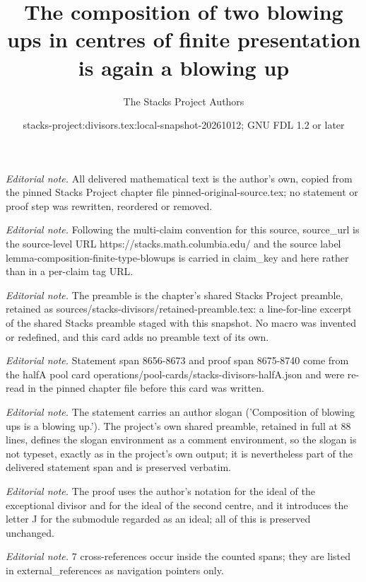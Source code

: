 \documentclass[10pt,a4paper]{amsart}
\title{The composition of two blowing ups in centres of finite presentation is again a blowing up}
\author{The Stacks Project Authors}
\date{stacks-project:divisors.tex:local-snapshot-20261012; GNU FDL 1.2 or later}
\theoremstyle{plain}
\theoremstyle{definition}
\theoremstyle{remark}
\numberwithin{equation}{subsection}
\begin{document}
\maketitle
\noindent\textit{Editorial note.} All delivered mathematical text is the author's own, copied from the pinned Stacks Project chapter file pinned-original-source.tex; no statement or proof step was rewritten, reordered or removed.\par\medskip
\noindent\textit{Editorial note.} Following the multi-claim convention for this source, source\_url is the source-level URL https://stacks.math.columbia.edu/ and the source label lemma-composition-finite-type-blowups is carried in claim\_key and here rather than in a per-claim tag URL.\par\medskip
\noindent\textit{Editorial note.} The preamble is the chapter's shared Stacks Project preamble, retained as sources/stacks-divisors/retained-preamble.tex: a line-for-line excerpt of the shared Stacks preamble staged with this snapshot. No macro was invented or redefined, and this card adds no preamble text of its own.\par\medskip
\noindent\textit{Editorial note.} Statement span 8656-8673 and proof span 8675-8740 come from the halfA pool card operations/pool-cards/stacks-divisors-halfA.json and were re-read in the pinned chapter file before this card was written.\par\medskip
\noindent\textit{Editorial note.} The statement carries an author slogan ('Composition of blowing ups is a blowing up.'). The project's own shared preamble, retained in full at 88 lines, defines the slogan environment as a comment environment, so the slogan is not typeset, exactly as in the project's own output; it is nevertheless part of the delivered statement span and is preserved verbatim.\par\medskip
\noindent\textit{Editorial note.} The proof uses the author's notation for the ideal of the exceptional divisor and for the ideal of the second centre, and it introduces the letter J for the submodule regarded as an ideal; all of this is preserved unchanged.\par\medskip
\noindent\textit{Editorial note.} 7 cross-references occur inside the counted spans; they are listed in external\_references as navigation pointers only.\par\medskip
\end{document}
